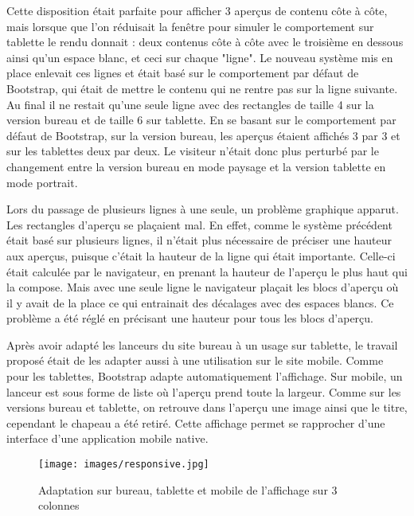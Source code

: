 \documentclass[12pt,a4paper]{article}
\begin{document}
Cette disposition était parfaite pour afficher 3 aperçus de contenu côte à côte, mais lorsque que l'on réduisait la fenêtre pour simuler le comportement sur tablette le rendu donnait : deux contenus côte à côte avec le troisième en dessous ainsi qu'un espace blanc, et ceci sur chaque "ligne". Le nouveau système mis en place enlevait ces lignes et était basé sur le comportement par défaut de Bootstrap, qui était de mettre le contenu qui ne rentre pas sur la ligne suivante. Au final il ne restait qu'une seule ligne avec des rectangles de taille 4 sur la version bureau et de taille 6 sur tablette. En se basant sur le comportement par défaut de Bootstrap, sur la version bureau, les aperçus étaient affichés 3 par 3 et sur les tablettes deux par deux. Le visiteur n'était donc plus perturbé par le changement entre la version bureau en mode paysage et la version tablette en mode portrait.\par
\medskip
Lors du passage de plusieurs lignes à une seule, un problème graphique apparut. Les rectangles d'aperçu se plaçaient mal. En effet, comme le système précédent était basé sur plusieurs lignes, il n'était plus nécessaire de préciser une hauteur aux aperçus, puisque c'était la hauteur de la ligne qui était importante. Celle-ci était calculée par le navigateur, en prenant la hauteur de l'aperçu le plus haut qui la compose. Mais avec une seule ligne le navigateur plaçait les blocs d'aperçu où il y avait de la place ce qui entrainait des décalages avec des espaces blancs. Ce problème a été réglé en précisant une hauteur pour tous les blocs d'aperçu.\par 
\bigskip
Après avoir adapté les lanceurs du site bureau à un usage sur tablette, le travail proposé était de les adapter aussi à une utilisation sur le site mobile. Comme pour les tablettes, Bootstrap adapte automatiquement l'affichage. Sur mobile, un lanceur est sous forme de liste où l'aperçu prend toute la largeur. Comme sur les versions bureau et tablette, on retrouve dans l'aperçu une image ainsi que le titre, cependant le chapeau a été retiré. Cette affichage permet se rapprocher d'une interface d'une application mobile native.\par


\begin{figure}[h!]
\centering\texttt{[image: images/responsive.jpg]} 
\caption{Adaptation sur bureau, tablette et mobile de l'affichage sur 3 colonnes}
\end{figure}
\newpage
\end{document}
